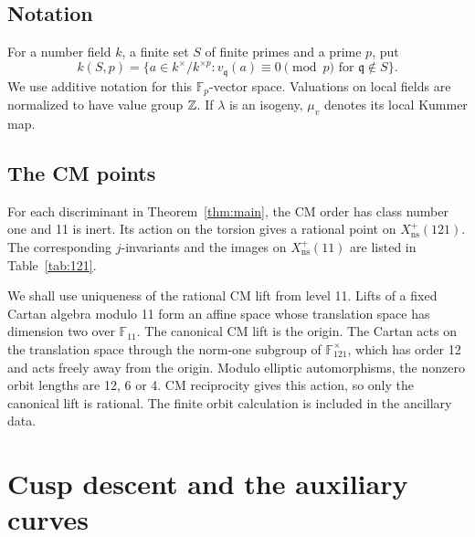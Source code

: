 \documentclass[11pt,reqno]{amsart}
\newcommand{\F}{\mathbb F}\newcommand{\OO}{\mathcal O}
\newcommand{\ns}{\mathrm{ns}}\newcommand{\GL}{\operatorname{GL}}
\newcommand{\Xns}[1]{X_{\ns}^{+}(#1)}
\theoremstyle{definition}\newtheorem{definition}[theorem]{Definition}
\theoremstyle{remark}\newtheorem{remark}[theorem]{Remark}
\numberwithin{equation}{section}
\begin{document}
\subsection{Notation}
For a number field \(k\), a finite set \(S\) of finite primes and
a prime \(p\), put
\[
 k(S,p)=\{a\in k^\times/k^{\times p}:
 v_\mathfrak q(a)\equiv0\pmod p\text{ for }\mathfrak q\notin S\}.
\]
We use additive notation for this \(\F_p\)-vector space.
Valuations on local fields are normalized to have value group
\(\mathbb Z\). If \(\lambda\) is an isogeny, \(\mu_v\) denotes its
local Kummer map.

\subsection{The CM points}
For each discriminant in Theorem~\ref{thm:main}, the CM order
has class number one and 11 is inert. Its action on the torsion
gives a rational point on \(\Xns{121}\). The corresponding
\(j\)-invariants and the images on \(\Xns{11}\) are listed in
Table~\ref{tab:121}.

We shall use uniqueness of the rational CM lift from level 11.
Lifts of a fixed Cartan algebra modulo 11 form an affine space
whose translation space has dimension two over \(\F_{11}\).
The canonical CM lift is the origin. The Cartan acts on the
translation space through the norm-one subgroup of
\(\F_{121}^\times\), which has order 12 and acts freely away from
the origin. Modulo elliptic automorphisms, the nonzero orbit
lengths are 12, 6 or 4. CM reciprocity gives this action, so
only the canonical lift is rational. The finite orbit calculation
is included in the ancillary data.

\section{Cusp descent and the auxiliary curves}\label{sec:121}
\end{document}
